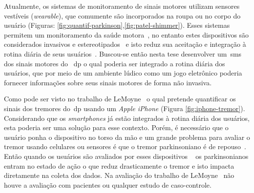 Atualmente, os sistemas de monitoramento de sinais motores utilizam sensores vestíveis (\textit{wearable}), que comumente são incorporados na roupa ou no corpo do usuário (Figuras: \ref{fig:quantif-parkinson},\ref{fig:patel-shimmer}). Esses sistemas permitem um monitoramento da saúde motora~\cite{patel_monitoring_2009,lemoyne2010}, no entanto estes dispositivos são considerados invasivos e estereotipados~\cite{aarhus_negotiating_2010} e isto reduz sua aceitação e integração à rotina diária de seus usuários~\cite{alemdar2015}. Buscou-se então nesta tese desenvolver um~\ac{sms} dos sinais motores do ~\ac{dp} o qual poderia ser integrado a rotina diária dos usuários, que por meio de um ambiente lúdico como um jogo eletrônico poderia fornecer informações sobre seus sinais motores de forma não invasiva. 

Como pode ser visto no trabalho de LeMoyne~\cite{lemoyne2010} o qual pretende quantificar os sinais dos tremores do~\ac{dp} usando um \textit{Apple iPhone} (Figura \ref{fig:iphone-tremor}). Considerando que os \textit{smartphones} já estão integrados à rotina diária dos usuários, esta poderia ser uma solução para esse contexto. Porém, é necessário que o usuário ponha o dispositivo no torso da mão e um grande problema para avaliar o tremor usando celulares ou sensores é que o tremor parkinsoniano é de repouso~\cite{jankovic2008}. Então quando os usuários são avaliados por esses dispositivos ~\cite{lemoyne2010,synnott_wiipd_2012} os parkinsonianos entram no estado de ação o que reduz drasticamente o tremor e isto impacta diretamente na coleta dos dados. Na avaliação do trabalho de LeMoyne~\cite{lemoyne2010} não houve a avaliação com pacientes ou qualquer estudo de caso-controle. %


